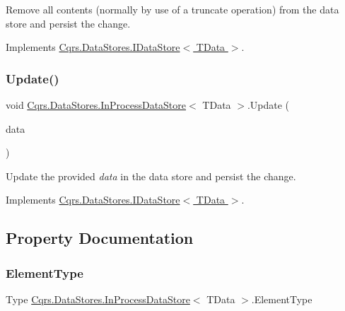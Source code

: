 Remove all contents (normally by use of a truncate operation) from the data store and persist the change. 



Implements \hyperlink{interfaceCqrs_1_1DataStores_1_1IDataStore_aead8d7a39a717d29af05daf7b64bea94}{Cqrs.\+Data\+Stores.\+I\+Data\+Store$<$ T\+Data $>$}.

\mbox{\label{classCqrs_1_1DataStores_1_1InProcessDataStore_af70e6f6e5aabc24ee12ef3d2bcd3bf60}} 
\subsubsection{\texorpdfstring{Update()}{Update()}}
{\footnotesize\ttfamily void \hyperlink{classCqrs_1_1DataStores_1_1InProcessDataStore}{Cqrs.\+Data\+Stores.\+In\+Process\+Data\+Store}$<$ T\+Data $>$.Update (\begin{DoxyParamCaption}\item[{T\+Data}]{data }\end{DoxyParamCaption})}



Update the provided {\itshape data}  in the data store and persist the change. 



Implements \hyperlink{interfaceCqrs_1_1DataStores_1_1IDataStore_a6d5d4dd572de8db01ff0c48d37faefa7}{Cqrs.\+Data\+Stores.\+I\+Data\+Store$<$ T\+Data $>$}.



\subsection{Property Documentation}
\mbox{\label{classCqrs_1_1DataStores_1_1InProcessDataStore_aacc8434efa0250be78dda57e159a5aa8}} 
\subsubsection{\texorpdfstring{Element\+Type}{ElementType}}
{\footnotesize\ttfamily Type \hyperlink{classCqrs_1_1DataStores_1_1InProcessDataStore}{Cqrs.\+Data\+Stores.\+In\+Process\+Data\+Store}$<$ T\+Data $>$.Element\+Type\hspace{0.3cm}{\ttfamily [get]}}



